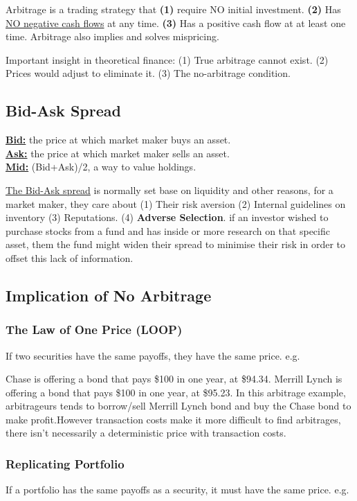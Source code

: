 Arbitrage is a trading strategy that \textbf{(1)} require NO initial investment. \textbf{(2)} Has \underline{NO negative cash flows} at any time. \textbf{(3)} Has a positive cash flow at at least one time. Arbitrage also implies and solves mispricing. 

\begin{multicols}{2}
Important insight in theoretical finance: (1) True arbitrage cannot exist. (2) Prices would adjust to eliminate it. (3) The no-arbitrage condition.

\subsection{Bid-Ask Spread}
\underline{\textbf{Bid:}} the price at which market maker buys an asset.\\[0.2cm]
\underline{\textbf{Ask:}} the price at which market maker sells an asset.\\[0.2cm]
\underline{\textbf{Mid:}} (Bid+Ask)/2, a way to value holdings.\par 
\underline{The Bid-Ask spread} is normally set base on liquidity and other reasons, for a market maker, they care about (1) Their risk aversion (2) Internal guidelines on inventory (3) Reputations. (4) \textbf{Adverse Selection}. if an investor wished to purchase stocks from a fund and has inside or more research on that specific asset, them the fund might widen their spread to minimise their risk in order to offset this lack of information.

\subsection{Implication of No Arbitrage}
\subsubsection{The Law of One Price (LOOP)}
If two securities have the same payoffs, they have the same price. e.g.\par 

Chase is offering a bond that pays \$100 in one year, at \$94.34.
Merrill Lynch is offering a bond that pays \$100 in one year, at \$95.23. In this arbitrage example, arbitrageurs tends to borrow/sell Merrill Lynch bond and buy the Chase bond to make profit.However transaction costs make it more difficult to find arbitrages, there isn't necessarily a deterministic price with transaction costs.

\subsubsection{Replicating Portfolio}
If a portfolio has the same payoffs as a security, it must have the same price. e.g.\par


\end{multicols}
